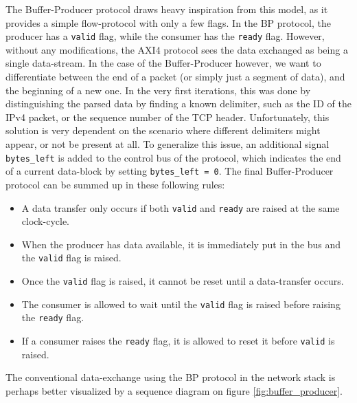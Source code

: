 The Buffer-Producer protocol draws heavy inspiration from this model, as it
provides a simple flow-protocol with only a few flags. In the BP protocol,
the producer has a \texttt{valid} flag, while the consumer has the
\texttt{ready} flag. However, without any modifications, the AXI4 protocol sees
the data exchanged as being a single data-stream.
In the case of the Buffer-Producer however, we want to differentiate between the
end of a packet (or simply just a segment of data), and the beginning of a new
one. In the very first iterations, this was done by distinguishing the parsed
data by finding a known delimiter, such as the ID of the IPv4 packet, or the
sequence number of the TCP header. Unfortunately, this solution is very
dependent on the scenario where different delimiters might appear, or not be
present at all. To generalize this issue, an additional signal
\texttt{bytes\_left} is added to the control bus of the protocol, which
indicates the end of a current data-block by setting \texttt{bytes\_left = 0}.
The final Buffer-Producer protocol can be summed up in these following rules:
\begin{itemize}
	\item A data transfer only occurs if both \texttt{valid} and \texttt{ready}
		are raised at the same clock-cycle.
	\item When the producer has data available, it is immediately put in
		the bus and the \texttt{valid} flag is raised.
	\item Once the \texttt{valid} flag is raised, it cannot be reset until
		a data-transfer occurs.
	\item The consumer is allowed to wait until the \texttt{valid} flag is
		raised before raising the \texttt{ready} flag.
	\item If a consumer raises the \texttt{ready} flag, it is allowed to
		reset it before \texttt{valid} is raised.
\end{itemize}

The conventional data-exchange using the BP protocol in the network
stack is perhaps better visualized by a sequence diagram on figure
\ref{fig:buffer_producer}.


